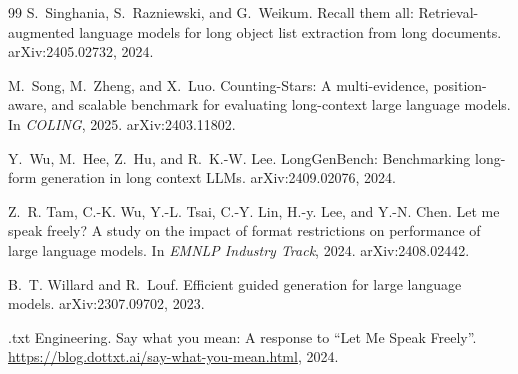 \documentclass[11pt]{article}
\begin{document}
\begin{thebibliography}{99}
S.~Singhania, S.~Razniewski, and G.~Weikum.
\newblock Recall them all: Retrieval-augmented language models for long object
  list extraction from long documents.
\newblock arXiv:2405.02732, 2024.

M.~Song, M.~Zheng, and X.~Luo.
\newblock Counting-Stars: A multi-evidence, position-aware, and scalable
  benchmark for evaluating long-context large language models.
\newblock In \emph{COLING}, 2025. arXiv:2403.11802.

Y.~Wu, M.~Hee, Z.~Hu, and R.~K.-W. Lee.
\newblock LongGenBench: Benchmarking long-form generation in long context LLMs.
\newblock arXiv:2409.02076, 2024.

Z.~R. Tam, C.-K. Wu, Y.-L. Tsai, C.-Y. Lin, H.-y. Lee, and Y.-N. Chen.
\newblock Let me speak freely? A study on the impact of format restrictions on
  performance of large language models.
\newblock In \emph{EMNLP Industry Track}, 2024. arXiv:2408.02442.

B.~T. Willard and R.~Louf.
\newblock Efficient guided generation for large language models.
\newblock arXiv:2307.09702, 2023.

.txt Engineering.
\newblock Say what you mean: A response to ``Let Me Speak Freely''.
\newblock \url{https://blog.dottxt.ai/say-what-you-mean.html}, 2024.

\end{thebibliography}
\end{document}
